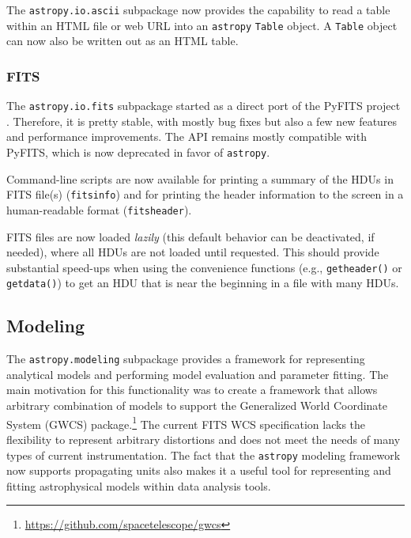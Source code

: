 \documentclass[modern]{aastex61}
\newcommand{\package}[1]{\texttt{#1}\xspace}
\newcommand{\astropypkg}{\package{astropy}}
\begin{document}
The \package{astropy.io.ascii} subpackage now provides the capability
to read a table within an HTML file or web URL into an \astropypkg
\texttt{Table} object. A \texttt{Table} object can now also
be written out as an HTML table.

\subsubsection{FITS}

The \package{astropy.io.fits} subpackage started as a direct port of the
PyFITS project \citep{PyFITS}. Therefore, it is pretty stable, with mostly bug
fixes but also a few new features and performance improvements.  The API
remains mostly compatible with PyFITS, which is now deprecated in favor of
\astropypkg.

Command-line scripts are now available for printing a summary of the HDUs in
FITS file(s) (\texttt{fitsinfo}) and for printing the header information to
the screen in a human-readable format (\texttt{fitsheader}).

FITS files are now loaded \emph{lazily} (this default behavior can be
deactivated, if needed), where all HDUs are not loaded until
requested. This should provide substantial speed-ups when using the
convenience functions (e.g., \texttt{getheader()} or \texttt{getdata()}) to
get an HDU that is near the beginning in a file with many HDUs.

\subsection{Modeling}
\label{sec:modeling}

The \package{astropy.modeling} subpackage provides a framework for representing
analytical models and performing model evaluation and parameter fitting.
The main motivation for this functionality was to create a framework that
allows arbitrary combination of models to support the Generalized World
Coordinate System (GWCS) package.\footnote{\url{https://github.com/spacetelescope/gwcs}}
The current FITS WCS specification lacks the flexibility to represent
arbitrary distortions and does not meet the needs of many types of current instrumentation.
The fact that the \astropypkg modeling framework now supports propagating
units also makes it a useful tool for representing and fitting astrophysical
models within data analysis tools.
\end{document}
